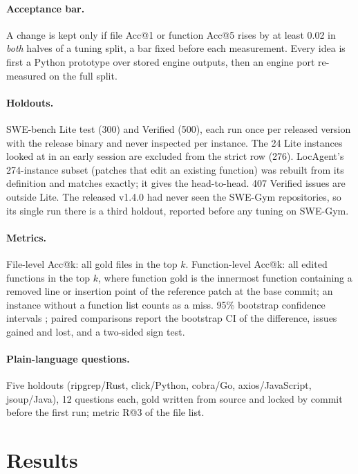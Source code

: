 \documentclass[10pt,twocolumn]{article}
\makeatletter
\newcommand{\accat}[1]{Acc@#1}
\makeatother
\begin{document}
\paragraph{Acceptance bar.}
A change is kept only if file \accat{1} or function \accat{5} rises by at least 0.02 in \emph{both}
halves of a tuning split, a bar fixed before each measurement. Every idea is first a Python
prototype over stored engine outputs, then an engine port re-measured on the full split.

\paragraph{Holdouts.}
SWE-bench Lite test (300) and Verified (500), each run once per released version with the release
binary and never inspected per instance. The 24 Lite instances looked at in an early session are
excluded from the strict row (276). LocAgent's 274-instance subset (patches that edit an existing
function) was rebuilt from its definition and matches exactly; it gives the head-to-head. 407
Verified issues are outside Lite. The released v1.4.0 had never seen the SWE-Gym repositories, so its
single run there is a third holdout, reported before any tuning on SWE-Gym.

\paragraph{Metrics.}
File-level \accat{k}: all gold files in the top $k$. Function-level \accat{k}: all edited functions in
the top $k$, where function gold is the innermost function containing a removed line or insertion
point of the reference patch at the base commit; an instance without a function list counts as a
miss. 95\% bootstrap confidence intervals \citep{efron1993bootstrap}; paired comparisons report the
bootstrap CI of the difference, issues gained and lost, and a two-sided sign test.

\paragraph{Plain-language questions.}
Five holdouts (ripgrep/Rust, click/Python, cobra/Go, axios/JavaScript, jsoup/Java), 12 questions
each, gold written from source and locked by commit before the first run; metric R@3 of the file
list.

\section{Results}
\label{sec:results}
\end{document}
